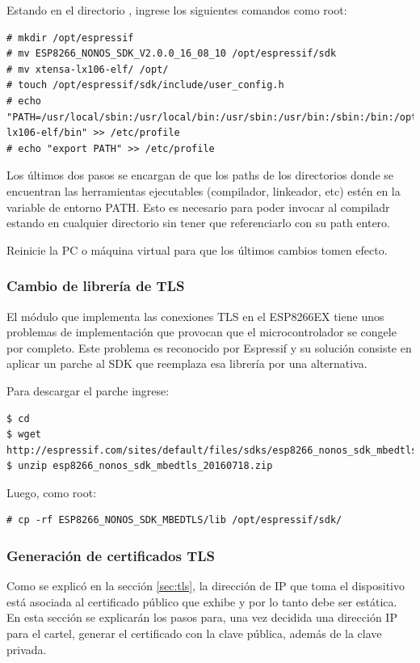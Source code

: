Estando en el directorio , ingrese los siguientes comandos como root:
\begin{lstlisting}
# mkdir /opt/espressif
# mv ESP8266_NONOS_SDK_V2.0.0_16_08_10 /opt/espressif/sdk
# mv xtensa-lx106-elf/ /opt/
# touch /opt/espressif/sdk/include/user_config.h
# echo "PATH=/usr/local/sbin:/usr/local/bin:/usr/sbin:/usr/bin:/sbin:/bin:/opt/xtensa-lx106-elf/bin" >> /etc/profile
# echo "export PATH" >> /etc/profile
\end{lstlisting}

Los últimos dos pasos se encargan de que los paths de los directorios donde se encuentran las herramientas ejecutables (compilador, linkeador, etc) estén en la variable de entorno PATH. Esto es necesario para poder invocar al compiladr estando en cualquier directorio sin tener que referenciarlo con su path entero.

Reinicie la PC o máquina virtual para que los últimos cambios tomen efecto.

\subsubsection{Cambio de librería de TLS}
El módulo que implementa las conexiones TLS en el ESP8266EX tiene unos problemas de implementación que provocan que el microcontrolador se congele por completo. Este problema es reconocido por Espressif y su solución consiste en aplicar un parche al SDK que reemplaza esa librería por una alternativa.

Para descargar el parche ingrese:
\begin{lstlisting}
$ cd
$ wget http://espressif.com/sites/default/files/sdks/esp8266_nonos_sdk_mbedtls_20160718.zip
$ unzip esp8266_nonos_sdk_mbedtls_20160718.zip
\end{lstlisting}

Luego, como root:

\begin{lstlisting}
# cp -rf ESP8266_NONOS_SDK_MBEDTLS/lib /opt/espressif/sdk/
\end{lstlisting}


\subsubsection{Generación de certificados TLS}\label{sec:cert-gen}
Como se explicó en la sección \ref{sec:tls}, la dirección de IP que toma el dispositivo está asociada al certificado público que exhibe y por lo tanto debe ser estática. En esta sección se explicarán los pasos para, una vez decidida una dirección IP para el cartel, generar el certificado con la clave pública, además de la clave privada.

